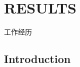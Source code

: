 \chapter{RESULTS}
\label{ch:results}

\begin{CJK}{UTF8}{bsmi}
工作经历
\end{CJK}

\section{Introduction}




